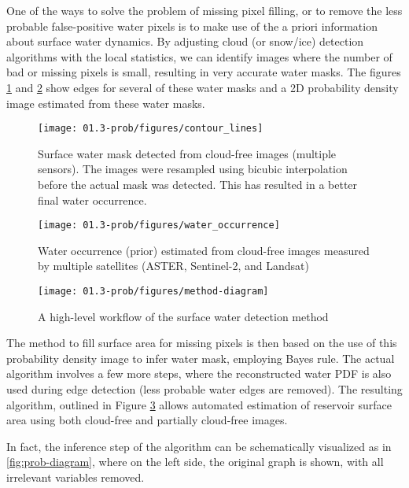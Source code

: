 One of the ways to solve the problem of missing pixel filling, or to remove the less probable false-positive water pixels is to make use of the a priori information about surface water dynamics. By adjusting cloud (or snow/ice) detection algorithms with the local statistics, we can identify images where the number of bad or missing pixels is small, resulting in very accurate water masks. The figures \ref{fig:prob-water-isolines} and \ref{fig:prob-water-density} show edges for several of these water masks and a 2D probability density image estimated from these water masks.

\begin{figure}[H]
	\centering
	\texttt{[image: 01.3-prob/figures/contour\_lines]}
	\caption{Surface water mask detected from cloud-free images (multiple sensors). The images were resampled using bicubic interpolation before the actual mask was detected. This has resulted in a better final water occurrence.}
	\label{fig:prob-water-isolines}
\end{figure}


\begin{figure}[H]
	\centering
	\texttt{[image: 01.3-prob/figures/water\_occurrence]}
	\caption{Water occurrence (prior) estimated from cloud-free images measured by multiple satellites (ASTER, Sentinel-2, and Landsat)}
	\label{fig:prob-water-density}
\end{figure}

\begin{figure}[H]
	\centering
	\texttt{[image: 01.3-prob/figures/method-diagram]}
	\caption{A high-level workflow of the surface water detection method}
	\label{fig:prob-workflow}
\end{figure}

The method to fill surface area for missing pixels is then based on the use of this probability density image to infer water mask, employing Bayes rule. The actual algorithm involves a few more steps, where the reconstructed water PDF is also used during edge detection (less probable water edges are removed). The resulting algorithm, outlined in Figure \ref{fig:prob-workflow} allows automated estimation of reservoir surface area using both cloud-free and partially cloud-free images. 

In fact, the inference step of the algorithm can be schematically visualized as in \ref{fig:prob-diagram}, where on the left side, the original graph is shown, with all irrelevant variables removed. 

